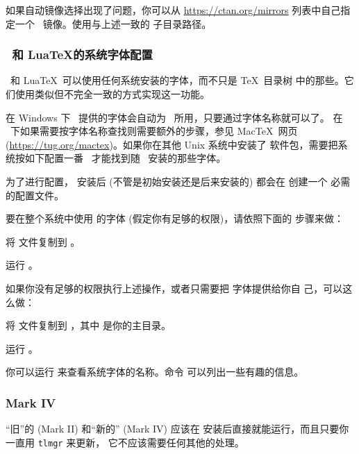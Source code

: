 \documentclass{article}
\begin{document}
如果自动镜像选择出现了问题，你可以从 \url{https://ctan.org/mirrors}
列表中自己指定一个 \CTAN\ 镜像。使用与上述一致的 
子目录路径。

\subsubsection{\protect\XeTeX\protect\ 和 Lua\protect\TeX 的系统字体配置}
\label{sec:font-conf-sys}

\XeTeX\ 和 Lua\TeX\ 可以使用任何系统安装的字体，而不只是 \TeX\ 目录树
中的那些。它们使用类似但不完全一致的方式实现这一功能。

在 Windows 下 \TL\ 提供的字体会自动为 \XeTeX\ 所用，只要通过字体名称就可以了。
在 \MacOSX\ 下如果需要按字体名称查找则需要额外的步骤，参见 Mac\TeX\ 网页
(\url{https://tug.org/mactex})。如果你在其他 Unix 系统中安装了 
软件包，需要把系统按如下配置一番 \XeTeX\ 才能找到随 \TL\ 安装的那些字体。

为了进行配置， 安装后 (不管是初始安装还是后来安装的) 都会在
 创建一个
必需的配置文件。

要在整个系统中使用 \TL{} 的字体 (假定你有足够的权限)，请依照下面的
步骤来做：
\begin{enumerate*}
  \item 将  文件复制到
  。
  \item 运行 。
\end{enumerate*}

如果你没有足够的权限执行上述操作，或者只需要把 \TL{} 字体提供给你自
己，可以这么做：
\begin{enumerate*}
  \item 将  文件复制到
  ，其中 \filename{~} 是你的主目录。
  \item 运行 。
\end{enumerate*}

你可以运行  来查看系统字体的名称。命令
 可以列出一些有趣的信息。

\subsubsection{\protect\ConTeXt{} Mark IV}
\label{sec:context-mkiv}

“旧”的 \ConTeXt{} (Mark II) 和“新的” \ConTeXt{} (Mark IV)
应该在 \TL{} 安装后直接就能运行，而且只要你一直用 \verb+tlmgr+ 来更新，
它不应该需要任何其他的处理。
\end{document}
